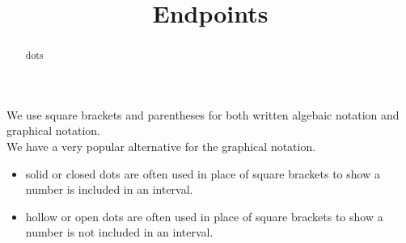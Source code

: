 \documentclass{ximera}
\title{Endpoints}
\begin{document}
\begin{abstract}
dots
\end{abstract}
\maketitle



We use square brackets and parentheses for both written algebaic notation and graphical notation.  \\


We have a very popular alternative for the graphical notation. \\


\begin{itemize}
    \item solid or closed dots are often used in place of square brackets to show a number is included in an interval.
    \item hollow or open dots are often used in place of square brackets to show a number is not included in an interval.
\end{itemize}
\end{document}
